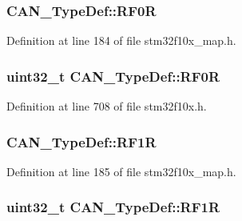 \subsubsection[{\texorpdfstring{R\+F0R}{RF0R}}]{ C\+A\+N\+\_\+\+Type\+Def\+::\+R\+F0R}\hypertarget{struct_c_a_n___type_def_ad986a55b09386abcc57c32310cbfd937}{}\label{struct_c_a_n___type_def_ad986a55b09386abcc57c32310cbfd937}


Definition at line 184 of file stm32f10x\+\_\+map.\+h.

\subsubsection[{\texorpdfstring{R\+F0R}{RF0R}}]{ {\bf uint32\+\_\+t} C\+A\+N\+\_\+\+Type\+Def\+::\+R\+F0R}\hypertarget{struct_c_a_n___type_def_ad8e858479e26ab075ee2ddb630e8769d}{}\label{struct_c_a_n___type_def_ad8e858479e26ab075ee2ddb630e8769d}


Definition at line 708 of file stm32f10x.\+h.

\subsubsection[{\texorpdfstring{R\+F1R}{RF1R}}]{ C\+A\+N\+\_\+\+Type\+Def\+::\+R\+F1R}\hypertarget{struct_c_a_n___type_def_a42a58b11f5b39c67770f9f80ad76c25e}{}\label{struct_c_a_n___type_def_a42a58b11f5b39c67770f9f80ad76c25e}


Definition at line 185 of file stm32f10x\+\_\+map.\+h.

\subsubsection[{\texorpdfstring{R\+F1R}{RF1R}}]{ {\bf uint32\+\_\+t} C\+A\+N\+\_\+\+Type\+Def\+::\+R\+F1R}\hypertarget{struct_c_a_n___type_def_a69a528d1288c1de666df68655af1d20e}{}\label{struct_c_a_n___type_def_a69a528d1288c1de666df68655af1d20e}


